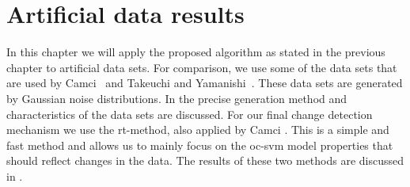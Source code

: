 
\chapter{Artificial data results}

\label{Chapter5} %

In this chapter we will apply the proposed algorithm as stated in the previous chapter to artificial data sets.
For comparison, we use some of the data sets that are used by Camci~\cite{camci2010change} and Takeuchi and Yamanishi~\cite{takeuchi2006unifying}.
These data sets are generated by Gaussian noise distributions.
In  the precise generation method and characteristics of the data sets are discussed.
For our final change detection mechanism we use the \gls{rt}-method, also applied by Camci \cite{camci2010change}.
This is a simple and fast method and allows us to mainly focus on the \gls{oc-svm} model properties that should reflect changes in the data.
The results of these two methods are discussed in .



